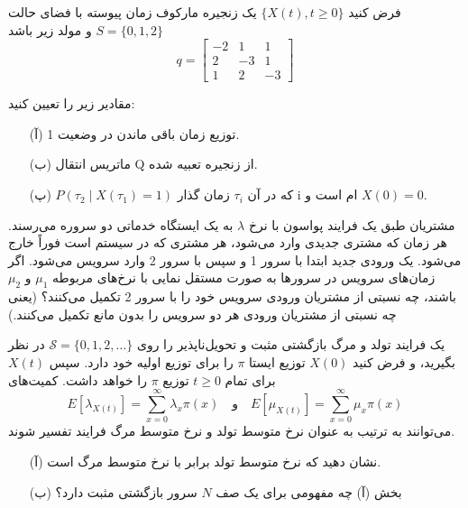 \documentclass[11pt, a4, twoside]{article}
\begin{document}
	\begin{problem}
		فرض کنید \(\{X(t), t \ge 0\}\) یک زنجیره مارکوف زمان پیوسته با فضای حالت \(S = \{0,1,2\}\) و مولد زیر باشد
		\[		q = \begin{bmatrix}
			-2 & 1 & 1 \\
			2 & -3 & 1 \\
			1 & 2 & -3
		\end{bmatrix}
		\]				

		مقادیر زیر را تعیین کنید:
		\begin{itemize}
			\item[(آ)]  توزیع زمان‌ باقی ماندن در وضعیت 1.
			\item[(ب)]  ماتریس انتقال Q از زنجیره تعبیه شده.
			\item[(پ)]  \(P(\tau_2 \mid X(\tau_1) = 1)\) که در آن \(\tau_{i}\) زمان گذار i ام است و \(X(0) = 0\).
		\end{itemize}
	\end{problem}

	\begin{problem}
		 مشتریان طبق یک فرایند پواسون با نرخ $\lambda$ به یک ایستگاه خدماتی دو سروره می‌رسند. هر زمان که مشتری جدیدی وارد می‌شود، هر مشتری که در سیستم است فوراً خارج می‌شود. یک ورودی جدید ابتدا با سرور 1 و سپس با سرور 2 وارد سرویس می‌شود. اگر زمان‌های سرویس در سرورها به صورت مستقل نمایی با نرخ‌های مربوطه $\mu_1$ و $\mu_2$ باشند، چه نسبتی از مشتریان ورودی سرویس خود را با سرور 2 تکمیل می‌کنند؟ (یعنی چه نسبتی از مشتریان ورودی هر دو سرویس را بدون مانع تکمیل می‌کنند.)
	\end{problem}
	
	\begin{problem}
	یک فرایند تولد و مرگ بازگشتی مثبت و تحویل‌ناپذیر را روی $\mathcal{S} = \{0, 1, 2, \ldots\}$ در نظر بگیرید، و فرض کنید $X(0)$ توزیع ایستا $\pi$ را برای توزیع اولیه خود دارد. سپس $X(t)$ برای تمام $t \ge 0$ توزیع $\pi$ را خواهد داشت. کمیت‌های
	\[ E[\lambda_{X(t)}] = \sum_{x=0}^{\infty} \lambda_x \pi(x) \quad \text{و} \quad E[\mu_{X(t)}] = \sum_{x=0}^{\infty} \mu_x \pi(x) \]
	می‌توانند به ترتیب به عنوان نرخ متوسط تولد و نرخ متوسط مرگ فرایند تفسیر شوند.
		\begin{itemize}
			\item[(آ)] نشان دهید که نرخ متوسط تولد برابر با نرخ متوسط مرگ است.
			\item[(ب)] بخش (آ) چه مفهومی برای یک صف $N$ سرور بازگشتی مثبت دارد؟
		\end{itemize}
	\end{problem}
\end{document}

